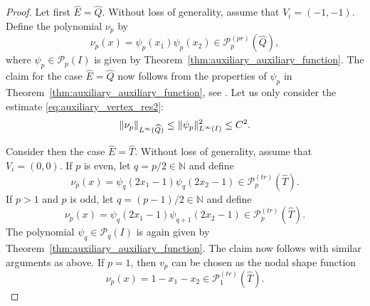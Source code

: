 \documentclass[english, 12pt, a4paper, sci, utf8, a-2b, online]{aaltothesis}
\theoremstyle{definition}
\theoremstyle{plain}
\DeclarePairedDelimiter\norm{\lVert}{\rVert}
\numberwithin{equation}{section}
\begin{document}
\begin{proof}
    Let first $\widehat{E} = \widehat{Q}$.
    Without loss of generality, assume that $V_i = (-1,-1)$.
    Define the polynomial $\nu_p$ by
    \begin{equation*}
        \nu_p(x) = \psi_p(x_1) \psi_p(x_2) \in \mathcal{P}_p^{(pr)}(\widehat{Q}),
    \end{equation*}
    where $\psi_p \in \mathcal{P}_p(I)$ is given by Theorem~\ref{thm:auxiliary_auxiliary_function}.
    The claim for the case $\widehat{E} = \widehat{Q}$ now follows from the properties
    of $\psi_p$ in Theorem~\ref{thm:auxiliary_auxiliary_function}, see \cite{babuskasuri1987}.
    Let us only consider the estimate \eqref{eq:auxiliary_vertex_res2}:
    \begin{equation*}
        \norm{\nu_p}_{L^{\infty}(\widehat{Q})}
        \leq \norm{\psi_p}_{L^{\infty}(I)}^2
        \leq C^2.
    \end{equation*}

    Consider then the case $\widehat{E} = \widehat{T}$.
    Without loss of generality, assume that $V_i = (0,0)$.
    If $p$ is even, let $q = p/2 \in \mathbb{N}$ and define
    \begin{equation*}
        \nu_p(x) = \psi_q(2x_1-1) \psi_q(2x_2-1)
        \in \mathcal{P}_p^{(tr)}(\widehat{T}).
    \end{equation*}
    If $p > 1$ and $p$ is odd, let $q = (p-1)/2 \in \mathbb{N}$ and define
    \begin{equation*}
        \nu_p(x) = \psi_q(2x_1-1) \psi_{q+1}(2x_2-1)
        \in \mathcal{P}_p^{(tr)}(\widehat{T}).
    \end{equation*}
    The polynomial $\psi_q \in \mathcal{P}_q(I)$ is again given by 
    Theorem~\ref{thm:auxiliary_auxiliary_function}.
    The claim now follows with similar arguments as above.
    If $p = 1$, then $v_p$ can be chosen as the nodal shape function
    \begin{equation*}
        \nu_p(x) = 1-x_1-x_2 \in \mathcal{P}_1^{(tr)}(\widehat{T}).
    \end{equation*}
\end{proof}
\end{document}
